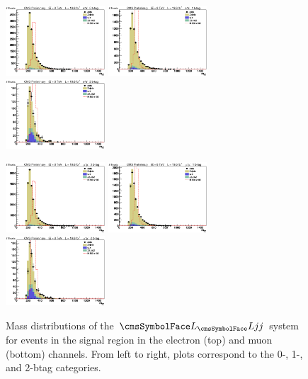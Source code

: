 \begin{figure}[htb]
\begin{center}
\centerline{
\includegraphics[width=0.33\textwidth]{presentation/defense/images/final/0/el/mZZ_signal.eps}
\includegraphics[width=0.33\textwidth]{presentation/defense/images/final/1/el/mZZ_signal.eps}
\includegraphics[width=0.33\textwidth]{presentation/defense/images/final/2/el/mZZ_signal.eps}
}
\centerline{
\includegraphics[width=0.33\textwidth]{presentation/defense/images/final/0/mu/mZZ_signal.eps}
\includegraphics[width=0.33\textwidth]{presentation/defense/images/final/1/mu/mZZ_signal.eps}
\includegraphics[width=0.33\textwidth]{presentation/defense/images/final/2/mu/mZZ_signal.eps}
}
\caption{Mass distributions of the $\LL jj$ system for events in the signal region in the electron (top) and muon (bottom) channels. From left to right, plots correspond to the 0-, 1-, and 2-btag categories.}
\label{fig:ichepllqq}
\end{center}
\end{figure}
